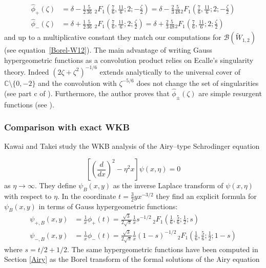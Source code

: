 \documentclass{article}
\theoremstyle{definition}
\newcommand{\C}{\mathbb{C}}
\newcommand{\borel}{\mathcal{B}}
\begin{document}
\begin{align*}
\hat{\phi}_+(\zeta)&=\delta-\frac{1}{2}\frac{5}{36}\,\, {}_2F_1\left(\frac{7}{6},\frac{11}{6};2;-\frac{\zeta}{2}\right)=\delta-\frac{2}{3}\frac{5}{48} {}_2F_1\left(\frac{7}{6},\frac{11}{6};2;-\frac{\zeta}{2}\right)\\
\hat{\phi}_-(\zeta)&=\delta+\frac{1}{2}\frac{5}{36}\,\, {}_2F_1\left(\frac{7}{6},\frac{11}{6};2;\frac{\zeta}{2}\right)=\delta+\frac{2}{3}\frac{5}{48} {}_2F_1\left(\frac{7}{6},\frac{11}{6};2;\frac{\zeta}{2}\right)
\end{align*} 
and up to a multiplicative constant they match our computations for $\borel(\tilde{W}_{1,2})$ (see equation~\eqref{Borel-W12}).
The main advantage of writing Gauss hypergeometric functions as a convolution product relies on Ecalle's singularity theory. Indeed $(2\zeta+\zeta^2)^{-1/6}$ extends analytically to the universal cover of $\C\setminus\lbrace 0,-2\rbrace$ and the convolution with $\zeta^{-5/6}$ does not change the set of singularities (see part c of \cite[Section 6.14.5]{diverg-resurg-i}). Furthermore, the author proves that $\hat{\phi}_{\pm}(\zeta)$ are simple resurgent functions (see \cite[Lemma 6.106]{diverg-resurg-i}). %

\subsubsection{Comparison with exact WKB}

Kawai and Takei study the WKB analysis of the Airy--type Schrodinger equation

\begin{equation}
\label{WKB_Airy} 
\left[\left(\frac{d}{dx}\right)^2 - \eta^2 x \right] \psi(x, \eta) = 0 
\end{equation}
as $\eta\to\infty$. They define $\psi_B(x, y)$ as the inverse Laplace transform of $\psi(x, \eta)$ with respect to $\eta$. In the coordinate $t=\frac{3}{2}yx^{-3/2}$ they find an explicit formula for $\psi_B(x,y)$ in terms of Gauss hypergeometric functions:
\begin{align*}
\psi_{+,B}(x,y)&=\frac{1}{x}\phi_+(t)=\frac{\sqrt{3}}{2\sqrt{\pi}}\frac{1}{x}s^{-1/2}\, {}_2F_1\left(\frac{1}{6},\frac{5}{6};\frac{1}{2};s\right)\\
\psi_{-,B}(x,y)&=\frac{1}{x}\phi_-(t)=\frac{\sqrt{3}}{2\sqrt{\pi}}\frac{1}{x}(1-s)^{-1/2}\, {}_2F_1\left(\frac{1}{6},\frac{5}{6};\frac{1}{2};1-s\right)
\end{align*}
where $s=t/2+1/2$. 
The same hypergeometric functions have been computed in Section \ref{Airy} as the Borel transform of the formal solutions of the Airy equation
\end{document}
